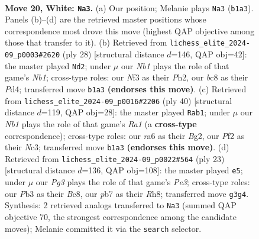 \documentclass[11pt]{article}
\begin{document}
\begin{figure}[p]\centering
\begin{subfigure}{0.46\textwidth}\centering
\resizebox{\linewidth}{!}{%
\newchessgame
\chessboard[
  setfen={2b5/1p2qpkp/r1n2np1/p2rB1Q1/P7/1P3NP1/5PBP/RN2R1K1 w - - 1 20},
  showmover=false,
  pgfstyle=straightmove, color=movearrow, markmove={b1-a3}
]}
\caption{}
\end{subfigure}\hfill
\begin{subfigure}{0.46\textwidth}\centering
\resizebox{\linewidth}{!}{%
\newchessgame
\chessboard[
  setfen={4r2r/ppq2kpp/2nbpnp1/3p4/3P1B1Q/2PN1P2/PP4PP/RN3RK1 w - - 6 15},
  showmover=false,
  pgfstyle=straightmove, color=movearrow, markmove={b1-d2}
]}
\caption{}
\end{subfigure}
\\[4pt]
\begin{subfigure}{0.46\textwidth}\centering
\resizebox{\linewidth}{!}{%
\newchessgame
\chessboard[
  setfen={r2r1bk1/1p2np1p/pq4p1/2n1p3/2P5/Q1N1P1P1/PB3PBP/R2R2K1 w - - 2 21},
  showmover=false,
  pgfstyle=straightmove, color=movearrow, markmove={a1-b1}
]}
\caption{}
\end{subfigure}\hfill
\begin{subfigure}{0.46\textwidth}\centering
\resizebox{\linewidth}{!}{%
\newchessgame
\chessboard[
  setfen={r1b4r/pp2kp1p/2n1pp2/2q5/1b3Q2/2N2NP1/PP2PP1P/2R1KB1R b K - 0 12},
  showmover=false,
  pgfstyle=straightmove, color=movearrow, markmove={e6-e5}
]}
\caption{}
\end{subfigure}
\caption{\textbf{Move 20, White: \texttt{Na3}.} (a) Our position; Melanie plays \texttt{Na3} (\texttt{b1a3}). Panels (b)--(d) are the retrieved master positions whose correspondence most drove this move (highest QAP objective among those that transfer to it). (b) Retrieved from \texttt{lichess\_elite\_2024-09\_p0003\#2620} (ply 28) [structural distance $d$=146, QAP obj=42]: the master played \texttt{Nd2}; under $\mu$ our \emph{Nb1} plays the role of that game's \emph{Nb1}; cross-type roles: our \emph{N}f3 as their \emph{P}h2, our \emph{b}c8 as their \emph{P}d4; transferred move \texttt{b1a3} \textbf{(endorses this move)}. (c) Retrieved from \texttt{lichess\_elite\_2024-09\_p0016\#2206} (ply 40) [structural distance $d$=119, QAP obj=28]: the master played \texttt{Rab1}; under $\mu$ our \emph{Nb1} plays the role of that game's \emph{Ra1} (a \textbf{cross-type} correspondence); cross-type roles: our \emph{r}a6 as their \emph{B}g2, our \emph{P}f2 as their \emph{N}c3; transferred move \texttt{b1a3} \textbf{(endorses this move)}. (d) Retrieved from \texttt{lichess\_elite\_2024-09\_p0022\#564} (ply 23) [structural distance $d$=136, QAP obj=108]: the master played \texttt{e5}; under $\mu$ our \emph{Pg3} plays the role of that game's \emph{Pe3}; cross-type roles: our \emph{P}b3 as their \emph{B}c8, our \emph{p}b7 as their \emph{R}h8; transferred move \texttt{g3g4}. Synthesis: 2 retrieved analogs transferred to \texttt{Na3} (summed QAP objective 70, the strongest correspondence among the candidate moves); Melanie committed it via the \texttt{search} selector.}
\label{fig:thought-m38}
\end{figure}
\end{document}
